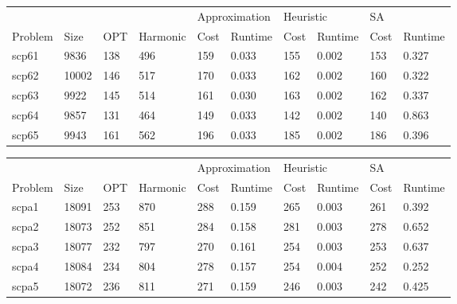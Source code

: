 \documentclass{report}
\begin{document}
\begin{table}[]
\centering
\begin{tabular}{@{}llllllllll@{}}
\toprule
        &       &     &          & \multicolumn{2}{l}{Approximation} & \multicolumn{2}{l}{Heuristic} & \multicolumn{2}{l}{SA} \\
Problem & Size  & OPT & Harmonic & Cost           & Runtime          & Cost         & Runtime        & Cost     & Runtime     \\ \midrule
scp61   & 9836  & 138 & 496      & 159            & 0.033            & 155          & 0.002          & 153      & 0.327       \\
scp62   & 10002 & 146 & 517      & 170            & 0.033            & 162          & 0.002          & 160      & 0.322       \\
scp63   & 9922  & 145 & 514      & 161            & 0.030            & 163          & 0.002          & 162      & 0.337       \\
scp64   & 9857  & 131 & 464      & 149            & 0.033            & 142          & 0.002          & 140      & 0.863       \\
scp65   & 9943  & 161 & 562      & 196            & 0.033            & 185          & 0.002          & 186      & 0.396       \\ \bottomrule
\end{tabular}
\end{table}

\begin{table}[]
\centering
\begin{tabular}{@{}llllllllll@{}}
\toprule
        &       &     &          & \multicolumn{2}{l}{Approximation} & \multicolumn{2}{l}{Heuristic} & \multicolumn{2}{l}{SA} \\
Problem & Size  & OPT & Harmonic & Cost           & Runtime          & Cost         & Runtime        & Cost     & Runtime     \\ \midrule
scpa1   & 18091 & 253 & 870      & 288            & 0.159            & 265          & 0.003          & 261      & 0.392       \\
scpa2   & 18073 & 252 & 851      & 284            & 0.158            & 281          & 0.003          & 278      & 0.652       \\
scpa3   & 18077 & 232 & 797      & 270            & 0.161            & 254          & 0.003          & 253      & 0.637       \\
scpa4   & 18084 & 234 & 804      & 278            & 0.157            & 254          & 0.004          & 252      & 0.252       \\
scpa5   & 18072 & 236 & 811      & 271            & 0.159            & 246          & 0.003          & 242      & 0.425       \\ \bottomrule
\end{tabular}
\end{table}
\end{document}
